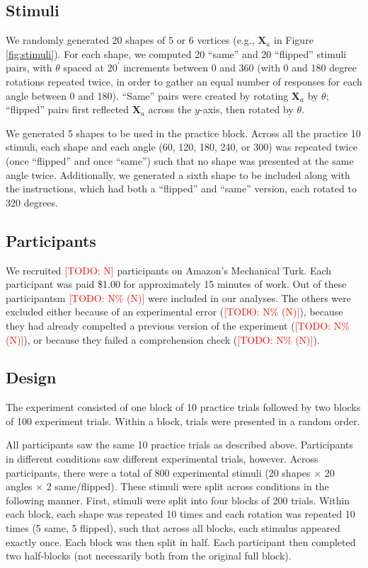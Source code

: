 \documentclass[10pt,letterpaper]{article}
\newcommand{\TODO}[1]{\textcolor{red}{[TODO: #1]}}
\newcommand{\Xa}[0]{\mathbf{X}_a}
\begin{document}
\subsection{Stimuli}

We randomly generated 20 shapes of 5 or 6 vertices (e.g., $\Xa$ in
Figure \ref{fig:stimuli}). For each shape, we computed 20 ``same'' and
20 ``flipped'' stimuli pairs, with $\theta$ spaced at $20^\prime$
increments between 0 and 360 (with 0 and 180 degree rotations repeated
twice, in order to gather an equal number of responses for each angle
between 0 and 180). ``Same'' pairs were created by rotating $\Xa$ by
$\theta$; ``flipped'' pairs first reflected $\Xa$ across the $y$-axis,
then rotated by $\theta$.

We generated 5 shapes to be used in the practice block. Across all the
practice 10 stimuli, each shape and each angle (60, 120, 180, 240, or
300) was repeated twice (once ``flipped'' and once ``same'') such that
no shape was presented at the same angle twice. Additionally, we
generated a sixth shape to be included along with the instructions,
which had both a ``flipped'' and ``same'' version, each rotated to 320
degrees.

\subsection{Participants}

We recruited \TODO{N} participants on Amazon's Mechanical Turk. Each
participant was paid \$1.00 for approximately 15 minutes of work. Out
of these participantsm \TODO{N\% (N)} were included in our
analyses. The others were excluded either because of an experimental
error (\TODO{N\% (N)}), because they had already compelted a previous
version of the experiment (\TODO{N\% (N)}), or because they failed a
comprehension check (\TODO{N\% (N)}).

\subsection{Design}

The experiment consisted of one block of 10 practice trials followed
by two blocks of 100 experiment trials. Within a block, trials were
presented in a random order.

All participants saw the same 10 practice trials as described
above. Participants in different conditions saw different experimental
trials, however. Across participants, there were a total of 800
experimental stimuli (20 shapes $\times$ 20 angles $\times$ 2
same/flipped). These stimuli were split across conditions in the
following manner. First, stimuli were split into four blocks of 200
trials. Within each block, each shape was repeated 10 times and each
rotation was repeated 10 times (5 same, 5 flipped), such that across
all blocks, each stimulus appeared exactly once. Each block was then
split in half. Each participant then completed two half-blocks (not
necessarily both from the original full block).
\end{document}
